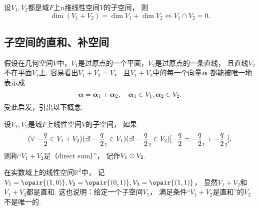 \begin{corollary}\label{theorem:线性空间.子空间.子空间的维数公式.推论1}
设\(V_1,V_2\)都是域\(F\)上\(n\)维线性空间\(V\)的子空间，
则\[
	\dim(V_1+V_2)=\dim V_1+\dim V_2
	\iff
	V_1 \cap V_2=0.
\]
\end{corollary}

\subsection{子空间的直和、补空间}
假设在几何空间\(V\)中，\(V_1\)是过原点的一个平面，\(V_2\)是过原点的一条直线，
且直线\(V_2\)不在平面\(V_1\)上.
容易看出\(V_1 + V_2 = V\)，
且\(V_1 + V_2\)中的每一个向量\(\boldsymbol\alpha\)
都能被唯一地表示成\[
	\boldsymbol\alpha = \boldsymbol\alpha_1 + \boldsymbol\alpha_2,
	\quad
	\boldsymbol\alpha_1 \in V_1,
	\boldsymbol\alpha_2 \in V_2.
\]
受此启发，引出以下概念.
\begin{definition}
设\(V_1,V_2\)是域\(F\)上线性空间\(V\)的子空间，
如果\[
	(\forall-\frac{q}{2}\in V_1+V_2)
	(\exists!-\frac{q}{2}_1\in V_1)
	(\exists!-\frac{q}{2}_2\in V_2)
	[-\frac{q}{2}=-\frac{q}{2}_1+-\frac{q}{2}_2],
\]
则称“\(V_1+V_2\)是（direct sum）”，
记作\(V_1 \oplus V_2\).
\end{definition}

\begin{example}\label{example:线性空间.子空间.直和.例1}
在实数域上的线性空间\(\mathbb{R}^2\)中，
记\(V_1=\opair{(1,0)},
V_2=\opair{(0,1)},
V_3=\opair{(1,1)}\)，
显然\(V_1+V_2\)和\(V_1+V_3\)都是直和.
这也说明：给定一个子空间\(V_1\)，
满足条件“\(V_1+V_2\)是直和”的\(V_2\)不是唯一的.
\end{example}

